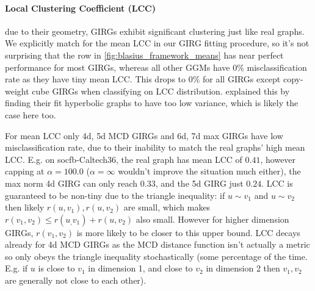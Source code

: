 


\paragraph{Local Clustering Coefficient (LCC)} due to their geometry, GIRGs exhibit significant clustering just like real graphs. We explicitly match for the mean LCC in our GIRG fitting procedure, so it's not surprising that the  row in \cref{fig:blasius_framework_means} has near perfect performance for most GIRGs, whereas all other GGMs have $0\%$ misclassification rate as they have tiny mean LCC. This drops to $0\%$ for all GIRGs except copy-weight cube GIRGs when classifying on LCC distribution.  \cite{blasius2018towards} explained this by finding their fit hyperbolic graphs to have too low variance, which is likely the case here too.

For mean LCC only 4d, 5d MCD GIRGs and 6d, 7d max GIRGs have low misclassification rate, due to their inability to match the real graphs' high mean LCC. E.g. on socfb-Caltech36, the real graph has mean LCC of $0.41$, however capping at $\alpha=100.0$ ($\alpha=\infty$ wouldn't improve the situation much either), the max norm 4d GIRG can only reach $0.33$, and the 5d GIRG just $0.24$. LCC is guaranteed to be non-tiny due to the triangle inequality: if $u \sim v_1$ and $u \sim v_2$ then likely $r(u, v_1), r(u, v_2)$ are small, which makes $r(v_1, v_2) \leq r(u_, v_1) + r(u, v_2)$ also small. However for higher dimension GIRGs, $r(v_1, v_2)$ is more likely to be closer to this upper bound. LCC decays already for 4d MCD GIRGs as the MCD distance function isn't actually a metric so only obeys the triangle inequality stochastically (some percentage of the time. E.g. if $u$ is close to $v_1$ in dimension 1, and close to $v_2$ in dimension 2 then $v_1, v_2$ are generally not close to each other).



